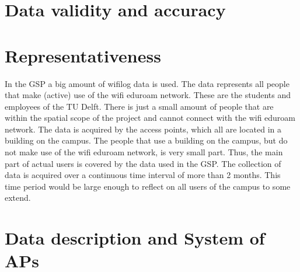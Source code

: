 \section{Data validity and accuracy}

\section{Representativeness}
In the GSP a big amount of wifilog data is used. The data represents all people that make (active) use of the wifi eduroam network. These are the students and employees of the TU Delft.  There is just a small amount of people that are within the spatial scope of the project and cannot connect with the wifi eduroam network. The data is acquired by the access points, which all are located in a building on the campus. The people that use a building on the campus, but do not make use of the wifi eduroam network, is very small part. Thus, the main part of actual users is covered by the data used in the GSP. The collection of data is acquired over a continuous time interval of more than 2 months. This time period would be large enough to reflect on all users of the campus to some extend.

\section{Data description and System of APs}\label{datadescriptionandsystemofaps}
